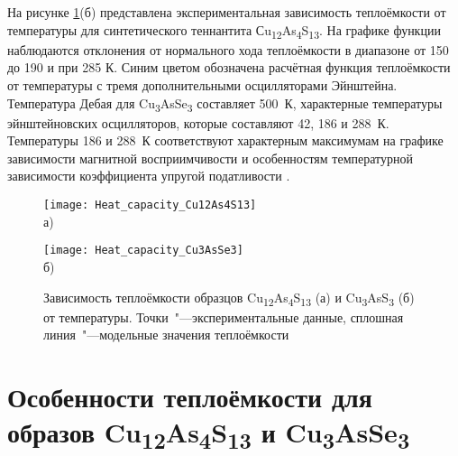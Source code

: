 На рисунке \ref{img:heat}(б) представлена экспериментальная зависимость теплоёмкости от температуры для синтетического теннантита Сu\textsubscript{12}As\textsubscript{4}S\textsubscript{13}. На графике функции наблюдаются отклонения от нормального хода теплоёмкости в диапазоне от 150 до 190 и при 285 К. Синим цветом обозначена расчётная функция теплоёмкости от температуры с тремя дополнительными осцилляторами Эйнштейна. Температура Дебая для Cu\textsubscript{3}AsSe\textsubscript{3} составляет 500~К, характерные температуры эйнштейновских осцилляторов, которые составляют 42, 186 и 288~К.   Температуры 186 и 288~К соответствуют характерным максимумам на графике зависимости магнитной восприимчивости и  особенностям температурной зависимости коэффициента упругой податливости \cite{bab_81}.

\begin{figure}[p!]
  \begin{minipage}[ht]{0.9\linewidth}\centering
    \texttt{[image: Heat\_capacity\_Cu12As4S13]} \\ а)
  \end{minipage}
  \vfill
  \begin{minipage}[ht]{0.9\linewidth}\centering
    \texttt{[image: Heat\_capacity\_Cu3AsSe3]} \\ б)
  \end{minipage}

      \caption[Зависимость теплоёмкости образцов Cu\textsubscript{12}As\textsubscript{4}S\textsubscript{13} (а) и Cu\textsubscript{3}AsS\textsubscript{3} (б) от температуры. Точки~"---экспериментальные данные, сплошная линия~"---модельные значения теплоёмкости]{Зависимость теплоёмкости образцов Cu\textsubscript{12}As\textsubscript{4}S\textsubscript{13} (а) и Cu\textsubscript{3}AsS\textsubscript{3} (б) от температуры. Точки~"---экспериментальные данные, сплошная линия~"---модельные значения теплоёмкости}
    \label{img:heat}
\end{figure}



\newpage

\section{Особенности теплоёмкости для образов Cu\textsubscript{12}As\textsubscript{4}S\textsubscript{13} и Cu\textsubscript{3}AsSe\textsubscript{3} } \label{sect4_5}

